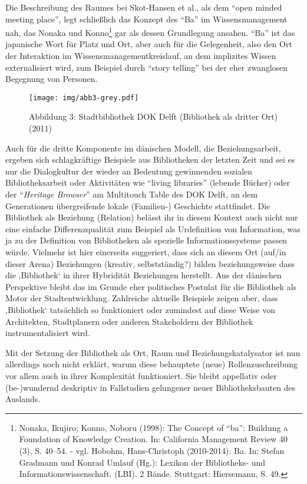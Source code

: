 Die Beschreibung des Raumes bei Skot-Hansen et al., als dem
\enquote{open minded meeting place}, legt schließlich das Konzept des
\enquote{Ba} im Wissensmanagement nah, das Nonaka und Konno\footnote{Nonaka,
  Ikujiro; Konno, Noboru (1998): The Concept of \enquote{ba}: Buildung a
  Foundation of Knowledge Creation. In: California Management Review 40
  (3), S. 40--54. - vgl. Hobohm, Hans-Christoph (2010-2014): Ba. In:
  Stefan Gradmann und Konrad Umlauf (Hg.): Lexikon der Bibliotheks- und
  Informationswissenschaft. (LBI). 2 Bände. Stuttgart: Hiersemann, S.
  49.} gar als dessen Grundlegung ansahen. \enquote{Ba} ist das
japanische Wort für Platz und Ort, aber auch für die Gelegenheit, also
den Ort der Interaktion im Wissensmanagementkreislauf, an dem implizites
Wissen externalisiert wird, zum Beispiel durch \enquote{story telling}
bei der eher zwanglosen Begegnung von Personen.

\begin{figure}[htbp]
\centering
\texttt{[image: img/abb3-grey.pdf]}
\caption*{Abbildung 3: Stadtbibliothek DOK Delft (Bibliothek als dritter
Ort)(2011)}
\end{figure}

Auch für die dritte Komponente im dänischen Modell, die
Beziehungsarbeit, ergeben sich schlagkräftige Beispiele aus Bibliotheken
der letzten Zeit und sei es nur die Dialogkultur der wieder an Bedeutung
gewinnenden sozialen Bibliotheksarbeit oder Aktivitäten wie
\enquote{living libraries} (lebende Bücher) oder der
\enquote{\emph{Heritage Browser}} am Multitouch Table des DOK Delft, an
dem Generationen übergreifende lokale (Familien-) Geschichte
stattfindet. Die Bibliothek als Beziehung (Relation) belässt ihr in
diesem Kontext auch nicht nur eine einfache Differenzqualität zum
Beispiel als Urdefinition von Information, was ja zu der Definition von
Bibliotheken als spezielle Informationssysteme passen würde. Vielmehr
ist hier einerseits suggeriert, dass sich an diesem Ort (auf/in dieser
Arena) Beziehungen (kreativ, selbstständig?) bilden beziehungsweise dass
die ‚Bibliothek` in ihrer Hybridität Beziehungen herstellt. Aus der
dänischen Perspektive bleibt das im Grunde eher politisches Postulat für
die Bibliothek als Motor der Stadtentwicklung. Zahlreiche aktuelle
Beispiele zeigen aber, dass ‚Bibliothek` tatsächlich so funktioniert
oder zumindest auf diese Weise von Architekten, Stadtplanern oder
anderen Stakeholdern der Bibliothek instrumentalisiert wird.

Mit der Setzung der Bibliothek als Ort, Raum und Beziehungskatalysator
ist nun allerdings noch nicht erklärt, warum diese behauptete (neue)
Rollenzuschreibung vor allem auch in ihrer Komplexität funktioniert. Sie
bleibt appellativ oder (be-)wundernd deskriptiv in Fallstudien
gelungener neuer Bibliotheksbauten des Auslands.

